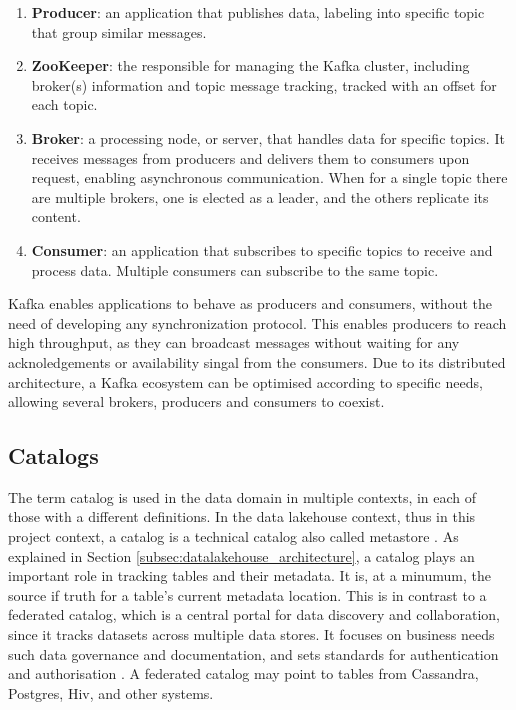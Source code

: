 \begin{enumerate}
    \item \textbf{Producer}: an application that publishes data, labeling into specific topic that group similar messages.
    \item \textbf{ZooKeeper}: the responsible for managing the Kafka cluster, including broker(s) information and topic message tracking, tracked with an offset for each topic.
    \item \textbf{Broker}: a processing node, or server, that handles data for specific topics. It receives messages from producers and delivers them to consumers upon request, enabling asynchronous communication. When for a single topic there are multiple brokers, one is elected as a leader, and the others replicate its content.
    \item \textbf{Consumer}: an application that subscribes to specific topics to receive and process data. Multiple consumers can subscribe to the same topic.
\end{enumerate}

Kafka enables applications to behave as producers and consumers, without the need of developing any synchronization protocol. This enables producers to reach high throughput, as they can broadcast messages without waiting for any acknoledgements or availability singal from the consumers. Due to its distributed architecture, a Kafka ecosystem can be optimised according to specific needs, allowing several brokers, producers and consumers to coexist.



\subsection{Catalogs}
\label{subsec:back_catalogs}
The term catalog is used in the data domain in multiple contexts, in each of those with a different definitions. In the data lakehouse context, thus in this project context, a catalog is a technical catalog also called metastore \cite{shiranApacheIcebergDefinitive2024}. As explained in Section \ref{subsec:datalakehouse_architecture}, a catalog plays an important role in tracking tables and their metadata. It is, at a minumum, the source if truth for a table's current metadata location. This is in contrast to a federated catalog, which is a central portal for data discovery and collaboration, since it tracks datasets across multiple data stores. It focuses on business needs such data governance and documentation, and sets standards for authentication and authorisation \cite{blueCatalogsRESTCatalog2024}. A federated catalog may point to tables from Cassandra, Postgres, Hiv, and other systems.

